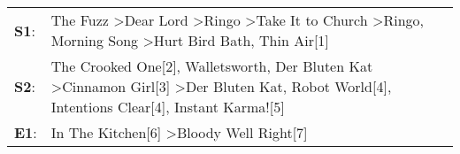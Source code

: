 \begin{supertabular}{p{0.03\textwidth}p{0.92\textwidth}}
 \textbf{S1}:  &         The Fuzz\textsuperscript{} \textgreater \enspace Dear Lord\textsuperscript{} \textgreater \enspace Ringo\textsuperscript{} \textgreater \enspace Take It to Church\textsuperscript{} \textgreater \enspace Ringo\textsuperscript{}, \enspace Morning Song\textsuperscript{} \textgreater \enspace Hurt Bird Bath\textsuperscript{}, \enspace Thin Air[1]\textsuperscript{}  \enspace  \\
 \textbf{S2}:  &  The Crooked One[2]\textsuperscript{}, \enspace Walletsworth\textsuperscript{}, \enspace Der Bluten Kat\textsuperscript{} \textgreater \enspace Cinnamon Girl[3]\textsuperscript{} \textgreater \enspace Der Bluten Kat\textsuperscript{}, \enspace Robot World[4]\textsuperscript{}, \enspace Intentions Clear[4]\textsuperscript{}, \enspace Instant Karma![5]\textsuperscript{}  \enspace  \\
 \textbf{E1}:  &                                                                                                                                                                                                                                                                                   In The Kitchen[6]\textsuperscript{} \textgreater \enspace Bloody Well Right[7]\textsuperscript{}  \enspace  \\
\end{supertabular}

